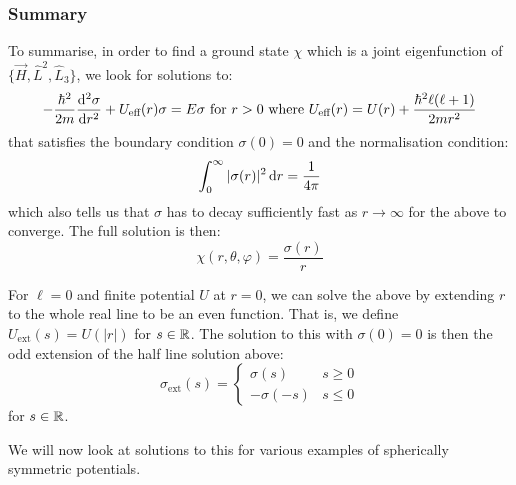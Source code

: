 \documentclass[../main.tex]{subfiles}
\begin{document}
\subsubsection{Summary}
To summarise, in order to find a ground state $\chi$ which is a joint eigenfunction of $\{\vec{H}, \hat{L}^2, \hat{L}_3\}$, we look for solutions to:
\[
  -\frac{\hbar^2}{2m} \deriv[2]{\sigma}{r} + U_{\text{eff}}(r)\sigma = E\sigma \text{ for } r > 0 \text{ where } U_{\text{eff}}(r) = U(r) + \frac{\hbar^2 \ell(\ell + 1)}{2mr^2}
\]
that satisfies the boundary condition $\sigma(0) = 0$ and the normalisation condition:
\[
  \int_{0}^{\infty} |\sigma(r)|^2 \d{r} = \frac{1}{4\pi}
\]
which also tells us that $\sigma$ has to decay sufficiently fast as $r \to \infty$ for the above to converge.
The full solution is then:
\[
  \chi(r, \theta, \varphi) = \frac{\sigma(r)}{r}
\]
\begin{remark}
  For $\ell = 0$ and finite potential $U$ at $r = 0$, we can solve the above by extending $r$ to the whole real line to be an even function.
  That is, we define $U_{\text{ext}}(s) = U(|r|)$ for $s \in \mathbb{R}$.
  The solution to this with $\sigma(0) = 0$ is then the odd extension of the half line solution above:
  \[
    \sigma_{\text{ext}}(s) = \begin{cases}
    \sigma(s) & s \geq 0 \\
    -\sigma(-s) & s \leq 0
    \end{cases}
  \]
  for $s \in \mathbb{R}$.
\end{remark}
We will now look at solutions to this for various examples of spherically symmetric potentials.
\end{document}
